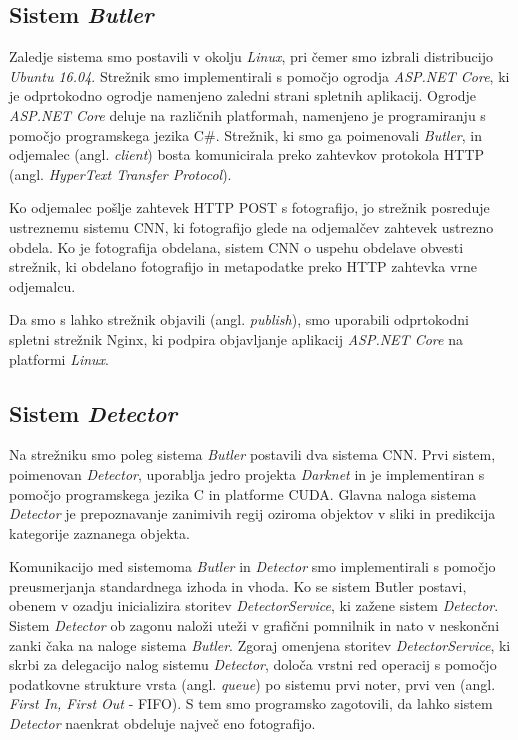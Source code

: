 \documentclass[runningheads,a4paper]{llncs}
\begin{document}
\subsection{Sistem \textit{Butler}}
Zaledje sistema smo postavili v okolju \textit{Linux}, pri čemer smo izbrali distribucijo \textit{Ubuntu 16.04}. Strežnik smo implementirali s pomočjo ogrodja \textit{ASP.NET Core}\cite{wiki:asp_net_core}, ki je odprtokodno ogrodje namenjeno zaledni strani spletnih aplikacij. Ogrodje \textit{ASP.NET Core} deluje na različnih platformah, namenjeno je programiranju s pomočjo programskega jezika C\#. Strežnik, ki smo ga poimenovali \textit{Butler}, in odjemalec (angl. \textit{client}) bosta komunicirala preko zahtevkov protokola HTTP (angl. \textit{HyperText Transfer Protocol}). 

Ko odjemalec pošlje zahtevek HTTP POST s fotografijo, jo strežnik posreduje ustreznemu sistemu CNN, ki fotografijo glede na odjemalčev zahtevek ustrezno obdela. Ko je fotografija obdelana, sistem CNN o uspehu obdelave obvesti strežnik, ki obdelano fotografijo in metapodatke preko HTTP zahtevka vrne odjemalcu.

Da smo s lahko strežnik objavili (angl. \textit{publish}), smo uporabili odprtokodni spletni strežnik Nginx\cite{wiki:nginx}, ki podpira objavljanje aplikacij \textit{ASP.NET Core} na platformi \textit{Linux}.

\subsection{Sistem \textit{Detector}}
Na strežniku smo poleg sistema \textit{Butler} postavili dva sistema CNN. Prvi sistem, poimenovan \textit{Detector}, uporablja jedro projekta \textit{Darknet} in je implementiran s pomočjo programskega jezika C in platforme CUDA. Glavna naloga sistema \textit{Detector} je prepoznavanje zanimivih regij oziroma objektov v sliki in predikcija kategorije zaznanega objekta. 

Komunikacijo med sistemoma \textit{Butler} in \textit{Detector} smo implementirali s pomočjo preusmerjanja standardnega izhoda in vhoda. Ko se sistem Butler postavi, obenem v ozadju inicializira storitev \textit{DetectorService}, ki zažene sistem \textit{Detector}. Sistem \textit{Detector} ob zagonu naloži uteži v grafični pomnilnik in nato v neskončni zanki čaka na naloge sistema \textit{Butler}. Zgoraj omenjena storitev \textit{DetectorService}, ki skrbi za delegacijo nalog sistemu \textit{Detector}, določa vrstni red operacij s pomočjo podatkovne strukture vrsta (angl. \textit{queue}) po sistemu prvi noter, prvi ven (angl. \textit{First In, First Out} - FIFO). S tem smo programsko zagotovili, da lahko sistem \textit{Detector} naenkrat obdeluje največ eno fotografijo.
\end{document}
